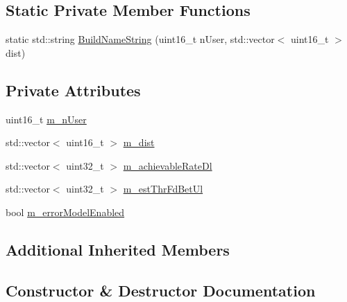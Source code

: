 \subsection*{Static Private Member Functions}
\begin{DoxyCompactItemize}
\item 
static std\+::string \hyperlink{classLenaFdBetFfMacSchedulerTestCase2_aa542758e44236bbcac95e659a94fc35b}{Build\+Name\+String} (uint16\+\_\+t n\+User, std\+::vector$<$ uint16\+\_\+t $>$ dist)
\end{DoxyCompactItemize}
\subsection*{Private Attributes}
\begin{DoxyCompactItemize}
\item 
uint16\+\_\+t \hyperlink{classLenaFdBetFfMacSchedulerTestCase2_a626729804ff1d44917c7ba38b68b8b78}{m\+\_\+n\+User}
\item 
std\+::vector$<$ uint16\+\_\+t $>$ \hyperlink{classLenaFdBetFfMacSchedulerTestCase2_a9592e66a8457fdae6ec5903bd0038948}{m\+\_\+dist}
\item 
std\+::vector$<$ uint32\+\_\+t $>$ \hyperlink{classLenaFdBetFfMacSchedulerTestCase2_aad2ad5fc6fa5eb0beb33a5ae45269c53}{m\+\_\+achievable\+Rate\+Dl}
\item 
std\+::vector$<$ uint32\+\_\+t $>$ \hyperlink{classLenaFdBetFfMacSchedulerTestCase2_ab64def4901dc0192ce44e970cd69b9a0}{m\+\_\+est\+Thr\+Fd\+Bet\+Ul}
\item 
bool \hyperlink{classLenaFdBetFfMacSchedulerTestCase2_a2925931eeed894cebffed3d453e739cd}{m\+\_\+error\+Model\+Enabled}
\end{DoxyCompactItemize}
\subsection*{Additional Inherited Members}


\subsection{Constructor \& Destructor Documentation}
